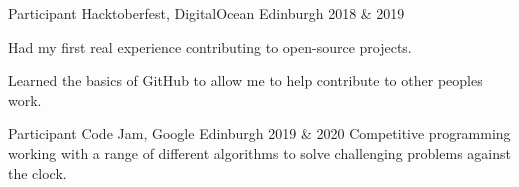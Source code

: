 \begin{cventries}

  \cventry
    {Participant} %
    {Hacktoberfest, DigitalOcean} %
    {Edinburgh} %
    {2018 \& 2019} %
    {
      \begin{cvitems} %
        \item {Had my first real experience contributing to open-source projects.}
        \item {Learned the basics of GitHub to allow me to help contribute to other peoples work.}
      \end{cvitems}
    }
    

  \cventry
     {Participant}
     {Code Jam, Google}
     {Edinburgh}
     {2019 \& 2020}
     {
      Competitive programming working with a range of different algorithms to solve challenging problems against the clock.
     }



\end{cventries}
